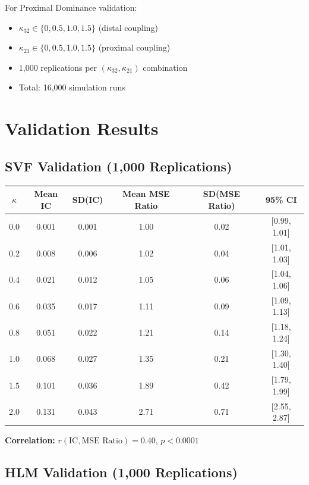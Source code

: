 \documentclass[10pt]{article} %
\theoremstyle{plain}
\theoremstyle{definition}
\newcommand{\IC}{\mathrm{IC}}  %
\begin{document}
For Proximal Dominance validation:
\begin{itemize}
\item $\kappa_{32} \in \{0, 0.5, 1.0, 1.5\}$ (distal coupling)
\item $\kappa_{21} \in \{0, 0.5, 1.0, 1.5\}$ (proximal coupling)
\item 1,000 replications per $(\kappa_{32}, \kappa_{21})$ combination
\item Total: 16,000 simulation runs
\end{itemize}


\section{Validation Results}
\label{app:validation}

\subsection{SVF Validation (1,000 Replications)}

\begin{center}
\begin{tabular}{cccccc}
\toprule
$\kappa$ & Mean IC & SD(IC) & Mean MSE Ratio & SD(MSE Ratio) & 95\% CI \\
\midrule
0.0 & 0.001 & 0.001 & 1.00 & 0.02 & [0.99, 1.01] \\
0.2 & 0.008 & 0.006 & 1.02 & 0.04 & [1.01, 1.03] \\
0.4 & 0.021 & 0.012 & 1.05 & 0.06 & [1.04, 1.06] \\
0.6 & 0.035 & 0.017 & 1.11 & 0.09 & [1.09, 1.13] \\
0.8 & 0.051 & 0.022 & 1.21 & 0.14 & [1.18, 1.24] \\
1.0 & 0.068 & 0.027 & 1.35 & 0.21 & [1.30, 1.40] \\
1.5 & 0.101 & 0.036 & 1.89 & 0.42 & [1.79, 1.99] \\
2.0 & 0.131 & 0.043 & 2.71 & 0.71 & [2.55, 2.87] \\
\bottomrule
\end{tabular}
\end{center}

\textbf{Correlation:} $r(\IC, \text{MSE Ratio}) = 0.40$, $p < 0.0001$

\subsection{HLM Validation (1,000 Replications)}
\end{document}
